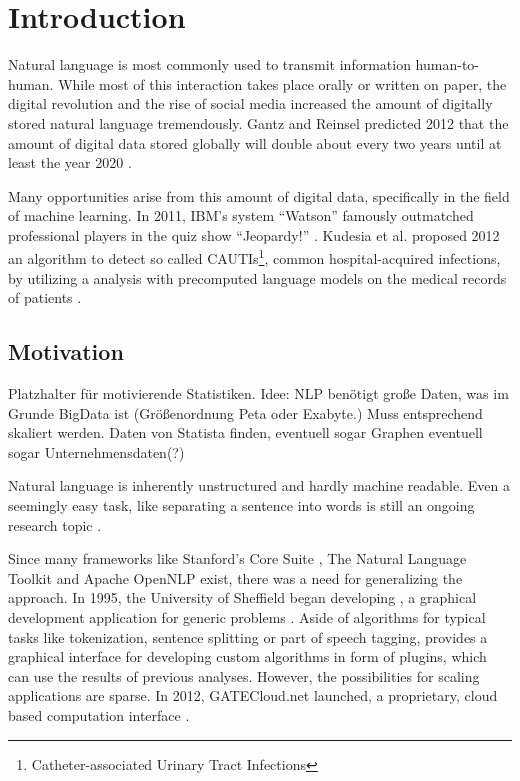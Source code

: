 
\chapter{Introduction}


Natural language is most commonly used to transmit information human-to-human. While most of this interaction takes place orally or written on paper, the digital revolution and the rise of social media increased the amount of digitally stored natural language tremendously. Gantz and Reinsel predicted 2012 that the amount of digital data stored globally will double about every two years until at least the year 2020 \cite{gantz2012digital}.

Many opportunities arise from this amount of digital data, specifically in the field of machine learning. In 2011, IBM's \qa{} system ``Watson'' famously outmatched professional players in the quiz show ``Jeopardy!'' \cite{ferrucci2012introduction,epstein2012making}. Kudesia et al. proposed 2012 an algorithm to detect so called CAUTIs\footnote{Catheter-associated Urinary Tract Infections}, common hospital-acquired infections, by utilizing a \nlp{} analysis with precomputed language models on the medical records of patients \cite{kudesia2012natural}.


\section{Motivation}

Platzhalter für motivierende Statistiken. Idee: NLP benötigt große Daten, was im Grunde BigData ist (Größenordnung Peta oder Exabyte.) Muss entsprechend skaliert werden. Daten von Statista finden, eventuell sogar Graphen eventuell sogar Unternehmensdaten(?)

Natural language is inherently unstructured and hardly machine readable. Even a seemingly easy task, like separating a sentence into words is still an ongoing research topic \cite{pak2018text}.

Since many \nlp{} frameworks like Stanford's Core \nlp Suite \cite{manning-EtAl:2014:P14-5}, The Natural Language Toolkit \cite{bird2004nltk} and Apache OpenNLP \cite{opennlp} exist, there was a need for generalizing the \nlp{} approach. In 1995, the University of Sheffield began developing \nlpGate{}, a graphical development application for generic \nlp{} problems \cite{cunningham2002gate}. Aside of algorithms for typical \nlp{} tasks like tokenization, sentence splitting or part of speech tagging, \nlpGate{} provides a graphical interface for developing custom algorithms in form of plugins, which can use the results of previous \nlp{} analyses. However, the possibilities for scaling \nlpGate{} applications are sparse. In 2012, GATECloud.net launched, a proprietary, cloud based \nlpGate{} computation interface \cite{tablan2013gatecloud}. 

